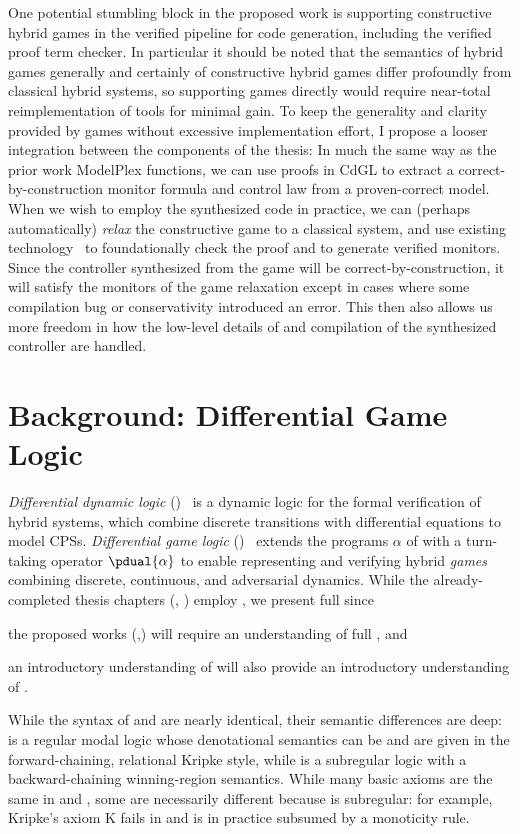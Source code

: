 \documentclass[12pt]{cmuthesis}
\theoremstyle{definition}
\theoremstyle{remark}
\newcommand{\rref}[2][]{\prettyref{#2}}
\newcommand{\CdGL}{\textsf{CdGL}\xspace}
\newcommand{\ModelPlex}{ModelPlex\xspace}
\begin{document}
One potential stumbling block in the proposed work is supporting constructive hybrid games in the verified pipeline for code generation, including the verified \dL proof term checker.
In particular it should be noted that the semantics of hybrid games generally and certainly of constructive hybrid games differ profoundly from classical hybrid systems, so supporting games directly would require near-total reimplementation of tools for minimal gain.
To keep the generality and clarity provided by games without excessive implementation effort, I propose a looser integration between the components of the thesis: In much the same way as the prior work \ModelPlex functions, we can use proofs in \CdGL to extract a correct-by-construction monitor formula and control law from a proven-correct model.
When we wish to employ the synthesized code in practice, we can (perhaps automatically) \emph{relax} the constructive game to a classical system, and use existing technology~\cite{DBLP:conf/pldi/BohrerTMMP18} to foundationally check the proof and to generate verified monitors.
Since the controller synthesized from the game will be correct-by-construction, it will satisfy the monitors of the game relaxation except in cases where some compilation bug or conservativity introduced an error.
This then also allows us more freedom in how the low-level details of and compilation of the synthesized controller are handled.

\chapter{Background: Differential Game Logic \dGL}
\emph{Differential dynamic logic} (\dL)~\cite{Platzer18,DBLP:journals/jar/Platzer08,DBLP:journals/jar/Platzer17,DBLP:conf/lics/Platzer12b:TR} is a dynamic logic for the formal verification of hybrid systems, which combine discrete transitions with differential equations to model CPSs.
\emph{Differential game logic} (\dGL)~\cite{DBLP:journals/tocl/Platzer15,DBLP:journals/tocl/Platzer17,DBLP:conf/cade/Platzer18} extends the programs $\alpha$ of \dL with a turn-taking operator $\pdual{\alpha}$ to enable representing and verifying hybrid \emph{games} combining discrete, continuous, and adversarial dynamics.
While the already-completed thesis chapters (\rref{ch:logical-foundations}, \rref{sec:veriphy}) employ \dL, we present full \dGL since 
\begin{inparaenum}[i)]
  \item the proposed works (\rref{ch:cdgl},\rref{ch:proofplex}) will require an understanding of full \dGL, and
  \item an introductory understanding of \dGL will also provide an introductory understanding of \dL.
\end{inparaenum}
While the syntax of \dGL and \dL are nearly identical, their semantic differences are deep: \dL is a regular modal logic whose denotational semantics can be and are given in the forward-chaining, relational Kripke style, while \dGL is a subregular logic with a backward-chaining winning-region semantics.
While many basic axioms are the same in \dL and \dGL, some are necessarily different because \dGL is subregular: for example, Kripke's axiom K fails in \dGL and is in practice subsumed by a monoticity rule.
\end{document}
